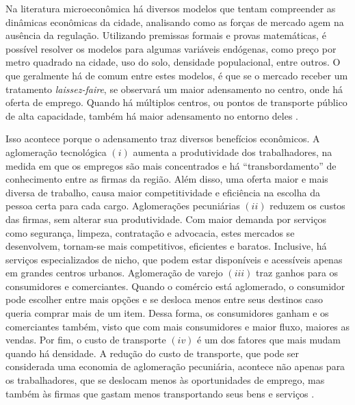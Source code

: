 Na literatura microeconômica há diversos modelos que tentam compreender as dinâmicas econômicas da cidade, analisando como as forças de mercado agem na ausência da regulação. Utilizando premissas formais e provas matemáticas, é possível resolver os modelos para algumas variáveis endógenas, como preço por metro quadrado na cidade, uso do solo, densidade populacional, entre outros. O que geralmente há de comum entre estes modelos, é que se o mercado receber um tratamento \textit{laissez-faire}, se observará um maior adensamento no centro, onde há oferta de emprego. Quando há múltiplos centros, ou pontos de transporte público de alta capacidade, também há maior adensamento no entorno deles \cite{papageorgiou2012essay, fujita1989urban}.


Isso acontece porque o adensamento traz diversos benefícios econômicos. A aglomeração tecnológica $(i)$ aumenta a produtividade dos trabalhadores, na medida em que os empregos são mais concentrados e há ``transbordamento'' de conhecimento entre as firmas da região. Além disso, uma oferta maior e mais diversa de trabalho, causa maior competitividade e eficiência na escolha da pessoa certa para cada cargo. Aglomerações pecuniárias $(ii)$ reduzem os custos das firmas, sem alterar sua produtividade. Com maior demanda por serviços como segurança, limpeza, contratação e advocacia, estes mercados se desenvolvem, tornam-se mais competitivos, eficientes e baratos. Inclusive, há serviços especializados de nicho, que podem estar disponíveis e acessíveis apenas em grandes centros urbanos. Aglomeração de varejo $(iii)$ traz ganhos para os consumidores e comerciantes. Quando o comércio está aglomerado, o consumidor pode escolher entre mais opções e se desloca menos entre seus destinos caso queria comprar mais de um item. Dessa forma, os consumidores ganham e os comerciantes também, visto que com mais consumidores e maior fluxo, maiores as vendas. Por fim, o custo de transporte $(iv)$ é um dos fatores que mais mudam quando há densidade. A redução do custo de transporte, que pode ser considerada uma economia de aglomeração pecuniária, acontece não apenas para os trabalhadores, que se deslocam menos às oportunidades de emprego, mas também às firmas que gastam menos transportando seus bens e serviços \cite{brueckner2011lectures}.

